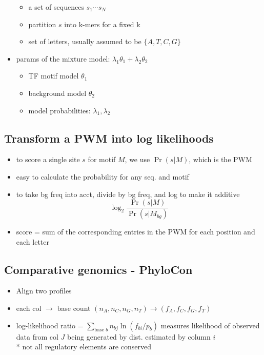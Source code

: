 \documentclass[font=12pt]{article}
\begin{document}
\begin{itemize}
\begin{itemize}
			\item a set of sequences $s_1\cdots s_N$
			\item partition $s$ into k-mers for a fixed k
			\item set of letters, usually assumed to be $\{A,T,C,G\}$
		\end{itemize}
	\item params of the mixture model: $\lambda_1\theta_1 +\lambda_2\theta_2$
		 \begin{itemize}
			 \item  TF motif model $\theta_1$
			 \item background model $\theta_2$
			 \item model probabilities: $\lambda_1, \lambda_2$
		\end{itemize}
\end{itemize}

\subsection{Transform a PWM into log likelihoods}
\begin{itemize}
	\item  to score a single site $s$ for motif $M$, we use  $\Pr(s|M)$, which is the PWM  
	\item easy to calculate the probability for any seq. and motif
	\item to take bg freq into acct, divide by bg freq, and log to make it additive\[\log_2\dfrac{\Pr(s|M)}{\Pr(s|M_{bg})}\]
	\item score = sum of the corresponding entries in the PWM for each position and each letter
\end{itemize}

\subsection{Comparative genomics - PhyloCon}
\begin{itemize}
	\item Align two profiles
	\item each col $\to$ base count $ (n_A, n_C, n_G, n_T) \to (f_A, f_C,f_G,f_T)$
	\item log-likelihood ratio = $ \sum_{\text{base }b} n_{bj}\ln (f_{bi}/p_b)  $ measures likelihood of observed data from col $J$ being generated by dist. estimated by column $i$\\
	* not all regulatory elements are conserved\\
\end{itemize}
\end{document}
